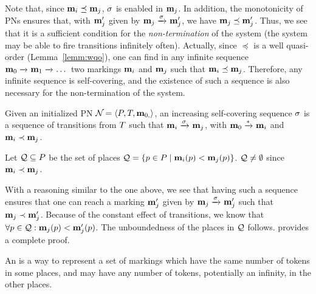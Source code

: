 Note that, since $\mathbf{m}_i \preceq \mathbf{m}_j$, $\seqt$ is enabled in $\mathbf{m}_j$.
In addition, the monotonicity of \acp{PN} ensures that, with $\mathbf{m}'_j$ given by $\mar_j \fire{\seqt} \mar'_j$, we have $\mathbf{m}_j \preceq \mathbf{m}'_j$.
Thus, we see that it is a sufficient condition for the \emph{non-termination} of the system (the system may be able to fire transitions infinitely often).
Actually, since $\preceq$ is a well quasi-order (Lemma~\ref{lemm:wqo}), one can find in any infinite sequence $\mathbf{m}_0 \xrightarrow{}_{} \mathbf{m}_1 \xrightarrow{}_{} \dots$ two markings $\mathbf{m}_i$ and $\mathbf{m}_j$ such that $\mathbf{m}_i \preceq \mathbf{m}_j$. 
Therefore, any infinite sequence is self-covering, and the existence of such a sequence is also necessary for the non-termination of the system.

\begin{defi}
  Given an initialized \ac{PN} $\mathcal{N}_{} = \left\langle P_{}, T_{}, \mathbf{m}_{0,}\right\rangle$,
  an increasing self-covering sequence $\seqt$ is a sequence of transitions from $T$ such that
  \(
    \mar_i \fire{\seqt} \mar_j
  \),
  with $\mathbf{m}_0 \xrightarrow{*}_{} \mathbf{m}_i$
  and $\mathbf{m}_i \prec \mathbf{m}_j$.
\end{defi}


Let $\mathcal{Q} \subseteq P$ be the set of places $\mathcal{Q} = \left\{p \in P \mid  \mathbf{m}_i(p) < \mathbf{m}_j(p)\right\}$.
$\mathcal{Q} \neq \emptyset$ since $\mathbf{m}_i \prec \mathbf{m}_j$.

With a reasoning similar to the one above, we see that having such a sequence ensures that one can reach a marking $\mathbf{m}'_j$ given by $\mar_j \fire{\seqt} \mar'_j$ such that $\mathbf{m}_j \prec \mathbf{m}'_j$.
Because of the constant effect of transitions, we know that $\forall p \in \mathcal{Q} : \mathbf{m}_j(p) < \mathbf{m}'_j(p)$.
The unboundedness of the places in $\mathcal{Q}$ follows.
\cite{David17} provides a complete proof.

An \omark is a way to represent a set of markings which have the same number of tokens in some places, and may have any number of tokens, potentially an infinity, in the other places.

